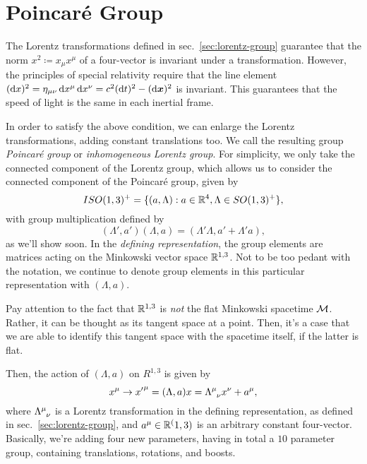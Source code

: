 \section{Poincaré Group}
The Lorentz transformations defined in sec.~\ref{sec:lorentz-group} guarantee that the norm $x^2 \coloneq x_\mu x^\mu$ of a four-vector is invariant under a transformation. However, the principles of special relativity require that the line element $(\mathop{}\!\mathrm{d} x)^2 = \eta_{\mu\nu} \mathop{}\!\mathrm{d} x^\mu \mathop{}\!\mathrm{d} x^\nu = c^2 (\mathop{}\!\mathrm{d} t)^2 - (\mathop{}\!\mathrm{d} \boldsymbol{x})^2$ is invariant. This guarantees that the speed of light is the same in each inertial frame. 

In order to satisfy the above condition, we can enlarge the Lorentz transformations, adding constant translations too. We call the resulting group \emph{Poincaré group} or \emph{inhomogeneous Lorentz group}. For simplicity, we only take the connected component of the Lorentz group, which allows us to consider the connected component of the Poincaré group, given by
\begin{equation}
    ISO(1,3)^+ = \{ (a,\Lambda) : a \in \mathbb{R}^4, \Lambda \in SO(1,3)^+ \},
\end{equation}
with group multiplication defined by
\begin{equation}
    (\Lambda', a') (\Lambda, a) = (\Lambda' \Lambda, a' + \Lambda' a),
\end{equation}
as we'll show soon. In the \emph{defining representation}, the group elements are matrices acting on the Minkowski vector space $\mathbb{R}^{1,3}$. Not to be too pedant with the notation, we continue to denote group elements in this particular representation with $(\Lambda,a)$.

\begin{remark}
    Pay attention to the fact that $\mathbb{R}^{1,3}$ is \emph{not} the flat Minkowski spacetime $\mathcal{M}$. Rather, it can be thought as its tangent space at a point. Then, it's a case that we are able to identify this tangent space with the spacetime itself, if the latter is flat.
\end{remark}

Then, the action of $(\Lambda,a)$ on $R^{1,3}$ is given by
\begin{equation}\label{eq:poincare-definition}
    x^\mu \to {x'}^\mu = (\Lambda, a) x = \tensor{\Lambda}{^\mu_\nu} x^\nu + a^\mu ,
\end{equation}
where $\tensor{\Lambda}{^\mu_\nu}$ is a Lorentz transformation in the defining representation, as defined in sec.~\ref{sec:lorentz-group}, and $a^\mu \in \mathbb{R}^(1,3)$ is an arbitrary constant four-vector. Basically, we're adding four new parameters, having in total a $10$ parameter group, containing translations, rotations, and boosts.

